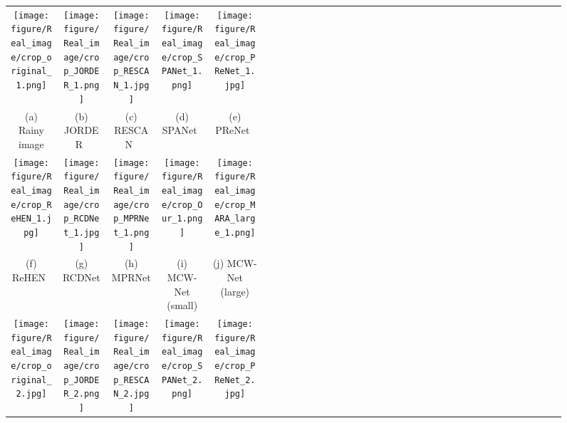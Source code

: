 \documentclass[a4paper,fleqn]{cas-dc}
\begin{document}
\begin{figure*}
	\centering
	\setlength{\tabcolsep}{0pt}
	\footnotesize{
	\begin{tabular}{cccccccclcccccccclcccccccclcccccccclccccccccl}
		\multicolumn{3}{c}{\texttt{[image: figure/Real\_image/crop\_original\_1.png]}}\ &
		\multicolumn{3}{c}{\texttt{[image: figure/Real\_image/crop\_JORDER\_1.png]}}\ &
		\multicolumn{3}{c}{\texttt{[image: figure/Real\_image/crop\_RESCAN\_1.jpg]}}\ &
		\multicolumn{3}{c}{\texttt{[image: figure/Real\_image/crop\_SPANet\_1.png]}}\ &
		\multicolumn{3}{c}{\texttt{[image: figure/Real\_image/crop\_PReNet\_1.jpg]}}\\

		
		\multicolumn{3}{c}{(a) Rainy image} &
		\multicolumn{3}{c}{(b) JORDER~\cite{yang2017deep}} &
		\multicolumn{3}{c}{(c) RESCAN~\cite{li2018recurrent}} &
		\multicolumn{3}{c}{(d) SPANet~\cite{wang2019spatial}} &
		\multicolumn{3}{c}{(e) PReNet~\cite{ren2019progressive} } \\

		
		\multicolumn{3}{c}{\texttt{[image: figure/Real\_image/crop\_ReHEN\_1.jpg]}}\ &
		\multicolumn{3}{c}{\texttt{[image: figure/Real\_image/crop\_RCDNet\_1.jpg]}}\ &
		\multicolumn{3}{c}{\texttt{[image: figure/Real\_image/crop\_MPRNet\_1.png]}}\ &
		\multicolumn{3}{c}{\texttt{[image: figure/Real\_image/crop\_Our\_1.png]}}\ &
		\multicolumn{3}{c}{\texttt{[image: figure/Real\_image/crop\_MARA\_large\_1.png]}}\\

		\multicolumn{3}{c}{(f) ReHEN~\cite{yang2019single}} &		
		\multicolumn{3}{c}{(g) RCDNet~\cite{wang2020model}} &
		\multicolumn{3}{c}{(h) MPRNet~\cite{zamir2021multi}} &
		\multicolumn{3}{c}{(i) MCW-Net (small)} &
		\multicolumn{3}{c}{(j) MCW-Net (large)} \\
		
		\multicolumn{3}{c}{\texttt{[image: figure/Real\_image/crop\_original\_2.jpg]}}\ &
		\multicolumn{3}{c}{\texttt{[image: figure/Real\_image/crop\_JORDER\_2.png]}}\ &
		\multicolumn{3}{c}{\texttt{[image: figure/Real\_image/crop\_RESCAN\_2.jpg]}}\ &
		\multicolumn{3}{c}{\texttt{[image: figure/Real\_image/crop\_SPANet\_2.png]}}\ &
		\multicolumn{3}{c}{\texttt{[image: figure/Real\_image/crop\_PReNet\_2.jpg]}}\\


\end{tabular}}
\end{figure*}
\end{document}
